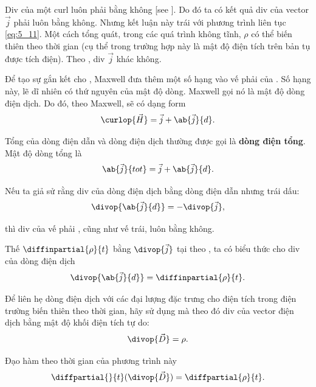 \noindent
Div của một curl luôn phải bằng không [see ].
Do đó ta có kết quả div của vector  $\vec{j}$ phải luôn bằng không.
Nhưng kết luận này trái với phương trình liên tục \eqref{eq:5_11}.
Một cách tổng quát, trong các quá trình không tĩnh, $\rho$ có thể biến thiên theo thời gian (cụ thể trong trường hợp này là mật độ điện tích trên bản tụ được tích điện).
Theo , div $\vec{j}$ khác không.

Để tạo sự gắn kết cho , Maxwell đưa thêm một số hạng vào vế phải của .
Số hạng này, lẽ dĩ nhiên có thứ nguyên của mật độ dòng.
Maxwell gọi nó là mật độ dòng điện dịch.
Do đó, theo Maxwell,  sẽ có dạng
form
\begin{equation}\label{eq:9_8}
    \curlop{\vec{H}} = \vec{j} + \ab{\vec{j}}{d}.
\end{equation}

Tổng của dòng điện dẫn và dòng điện dịch thường được gọi là \textbf{dòng điện tổng}.
Mật độ dòng tổng là
\begin{equation}\label{eq:9_9}
    \ab{\vec{j}}{tot} = \vec{j} + \ab{\vec{j}}{d}.
\end{equation}

Nếu ta giả sử rằng div của dòng điện dịch bằng dòng điện dẫn nhưng trái dấu:
\begin{equation}\label{eq:9_10}
    \divop{\ab{\vec{j}}{d}} = - \divop{\vec{j}},
\end{equation}

\noindent
thì div của vế phải , cũng như vế trái, luôn bằng không.

Thế $\diffinpartial{\rho}{t}$ bằng $\divop{\vec{j}}$ tại  theo , ta có biểu thức cho div của dòng điện dịch
\begin{equation}\label{eq:9_11}
    \divop{\ab{\vec{j}}{d}} = \diffinpartial{\rho}{t}.
\end{equation}

\noindent
Để liên hẹ dòng điện dịch với các đại lượng đặc trưng cho điện tích trong điện trường biến thiên theo thời gian, hãy sử dụng  mà theo đó div của vector điện dịch bằng mật độ khối điện tích tự do:
\begin{equation*}
    \divop{\vec{D}} = \rho.
\end{equation*}

\noindent
Đạo hàm theo thời gian của phương trình này
\begin{equation*}
    \diffpartial{}{t} (\divop{\vec{D}}) = \diffpartial{\rho}{t}.
\end{equation*}

